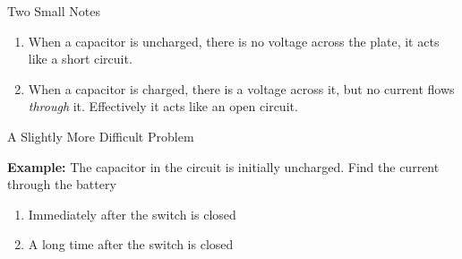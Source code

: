 \documentclass[12pt,aspectratio=169]{beamer}
\begin{document}
%    
%




\begin{frame}{Two Small Notes}
  \begin{enumerate}
  \item When a capacitor is uncharged, there is no voltage across the plate,
    it acts like a short circuit.
  \item When a capacitor is charged, there is a voltage across it, but no
    current flows \emph{through} it. Effectively it acts like an open circuit.
  \end{enumerate}
\end{frame}



\begin{frame}{A Slightly More Difficult Problem}
  \begin{center}
  \end{center}
  \textbf{Example:} The capacitor in the circuit is initially uncharged. Find
  the current through the battery
  \begin{enumerate}
  \item Immediately after the switch is closed
  \item A long time after the switch is closed
  \end{enumerate}
\end{frame}
\end{document}
